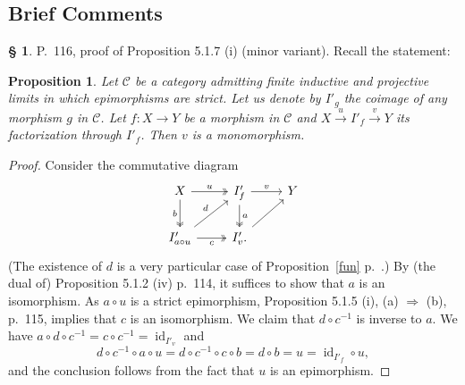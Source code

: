 \documentclass[12pt]{article}
\newtheorem{prop}[thm]{Proposition}
\theoremstyle{remark}
\theoremstyle{definition}
\newtheorem{s}[thm]{\S}
\newcommand{\C}{\mathcal C}
\newcommand{\mv}{ (minor variant)}
\newcommand{\then}{\Rightarrow}
\newcommand{\xr}{\xrightarrow}
\DeclareMathOperator{\id}{id}
\begin{document}
\subsection{Brief Comments}
%
\begin{s} 
P.~116, proof of Proposition 5.1.7 (i)\mv. Recall the statement: 
%
\begin{prop} 
Let $\C$ be a category admitting finite inductive and projective limits in which epimorphisms are strict. Let us denote by $I'_g$ the coimage of any morphism $g$ in $\C$. Let $f:X\to Y$ be a morphism in $\C$ and $X\xr u I'_f\xr v Y$ its factorization through $I'_f$. Then $v$ is a monomorphism. 
\end{prop}
%
\begin{proof}
Consider the commutative diagram
$$
\begin{tikzcd}
X\ar[two heads]{d}[swap]{b}\ar[two heads]{r}{u}&I'_f\ar[two heads]{d}{a}\ar{r}{v}&Y\\
I'_{a\circ u}\ar{ur}{d}\ar[two heads]{r}[swap]{c}&I'_v.\ar{ru}
\end{tikzcd}
$$ 
(The existence of $d$ is a very particular case of Proposition~\ref{fun} p.~\pageref{fun}.) 
By (the dual of) Proposition 5.1.2 (iv) p.~114, it suffices to show that $a$ is an isomorphism. As $a\circ u$ is a strict epimorphism, Proposition 5.1.5 (i), (a) $\then$ (b), p.~115, implies that $c$ is an isomorphism. We claim that $d\circ c^{-1}$ is inverse to $a$. We have $a\circ d\circ c^{-1}=c\circ c^{-1}=\id_{I'_v}$ and 
$$
d\circ c^{-1}\circ a\circ u=d\circ c^{-1}\circ c\circ b=d\circ b=u=\id_{I'_f}\circ u,
$$ 
and the conclusion follows from the fact that $u$ is an epimorphism.
\end{proof}
\end{s}
%
%
\end{document}

